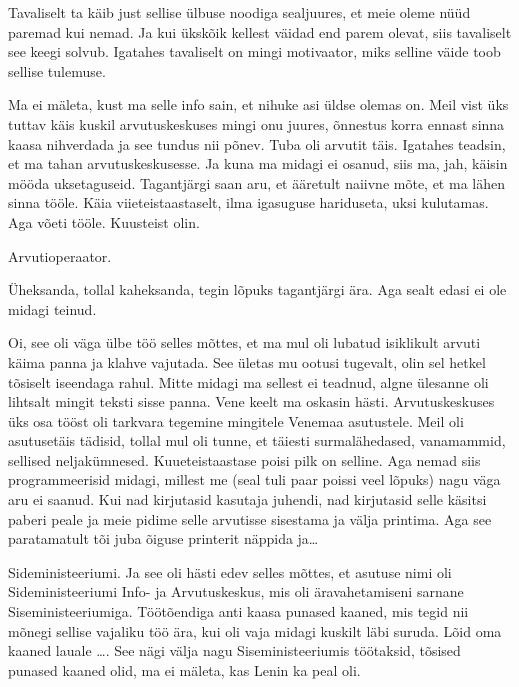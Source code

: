 Tavaliselt ta käib just sellise ülbuse noodiga sealjuures, et meie oleme nüüd paremad kui nemad. Ja kui ükskõik kellest väidad end parem olevat, siis tavaliselt see keegi solvub. Igatahes tavaliselt on mingi motivaator, miks selline väide toob sellise tulemuse. 


Ma ei mäleta, kust ma selle info sain, et nihuke asi üldse olemas on. Meil vist üks tuttav käis kuskil arvutuskeskuses  mingi onu juures, õnnestus korra ennast sinna kaasa nihverdada ja see tundus nii põnev. Tuba oli arvutit täis. Igatahes teadsin, et ma tahan arvutuskeskusesse. Ja kuna ma midagi ei osanud, siis ma, jah, käisin mööda  uksetaguseid. Tagantjärgi saan aru, et ääretult naiivne mõte, et ma lähen sinna tööle. Käia viieteistaastaselt, ilma igasuguse hariduseta, uksi kulutamas. Aga võeti tööle. Kuusteist olin.


Arvutioperaator. 


Üheksanda, tollal kaheksanda, tegin lõpuks tagantjärgi ära. Aga sealt edasi ei ole midagi teinud. 


Oi, see oli väga ülbe töö selles mõttes, et ma mul oli lubatud isiklikult arvuti käima panna ja klahve vajutada. See ületas mu ootusi tugevalt, olin sel hetkel tõsiselt iseendaga rahul. Mitte midagi ma sellest ei teadnud, algne ülesanne oli lihtsalt mingit teksti sisse panna. Vene keelt ma oskasin hästi. Arvutuskeskuses üks osa tööst oli  tarkvara tegemine mingitele Venemaa asutustele. Meil oli asutusetäis tädisid, tollal mul oli tunne, et täiesti surmalähedased, vanamammid, sellised neljakümnesed. Kuueteistaastase poisi pilk on selline. Aga nemad siis programmeerisid  midagi, millest me (seal tuli paar poissi veel lõpuks)  nagu väga aru ei saanud. Kui nad kirjutasid kasutaja juhendi, nad kirjutasid selle käsitsi paberi peale ja meie pidime selle arvutisse sisestama ja välja printima. Aga see paratamatult tõi juba õiguse printerit näppida ja\ldots


Sideministeeriumi. Ja see oli hästi edev selles mõttes, et asutuse nimi oli Sideministeeriumi Info- ja Arvutuskeskus, mis oli äravahetamiseni sarnane Siseministeeriumiga. Töötõendiga anti kaasa punased kaaned, mis tegid nii mõnegi sellise vajaliku töö ära, kui oli vaja midagi kuskilt läbi suruda. Lõid oma kaaned lauale \ldots. See nägi välja nagu Siseministeeriumis töötaksid, tõsised punased kaaned olid, ma ei mäleta, kas Lenin ka peal oli. 

